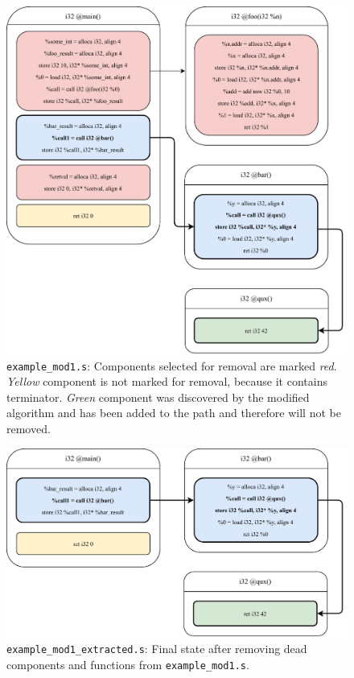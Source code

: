 \documentclass[12pt, twoside]{fithesis2}
\renewcommand{\_}{\leavevmode \kern0.07em\vbox{\hrule width0.4em}}
\begin{document}
\begin{figure}[ht]
    \centering
    \includegraphics[]{images/example_mod1/example_mod1_removing_prepare.pdf}
    \caption{
    \texttt{example_mod1.s}:
    Components selected for removal are marked \emph{red}.
    \emph{Yellow} component is not marked for removal, because it contains
    terminator. \emph{Green} component was discovered by the modified algorithm
    and has been added to the path and therefore will not be removed.
    }
    \label{fig:mod1_prepare}
\end{figure}

\clearpage

\begin{figure}[ht]
    \centering
    \includegraphics[]{images/example_mod1/example_mod1_removing_done.pdf}
    \caption{
    \texttt{example_mod1_extracted.s}:
    Final state after removing dead components and functions from
    \texttt{example_mod1.s}.
    }
    \label{fig:mod1_done}
\end{figure}
\end{document}
